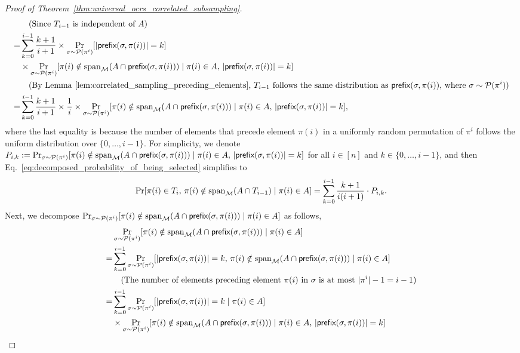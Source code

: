 \documentclass[11pt]{article}
\newcommand{\M}{{\mathcal M}}
\newcommand{\cP}{\mathcal P}
\newcommand{\pref}{\textnormal{\sffamily prefix}}
\newcommand{\spa}{\textnormal{span}}
\begin{document}
\begin{proof}[Proof of Theorem~\ref{thm:universal_ocrs_correlated_subsampling}]
\begin{align}
    &\quad\text{(Since $T_{i-1}$ is independent of $A$)}\nonumber\\
    =&\sum_{k=0}^{i-1} \frac{k+1}{i+1}\times\Pr_{\sigma\sim\cP(\pi^i)}[|\pref(\sigma,\pi(i))|=k]\nonumber\\
    &\times\Pr_{\sigma\sim\cP(\pi^i)}[\pi(i)\notin\spa_{\M}(A\cap \pref(\sigma,\pi(i)))\mid \pi(i)\in A,\,|\pref(\sigma,\pi(i))|=k]\nonumber\\
    &\quad\text{(By Lemma~\ref{lem:correlated_sampling_preceding_elements}, $T_{i-1}$ follows the same distribution as $\pref(\sigma,\pi(i))$, where $\sigma\sim\cP(\pi^i)$)}\nonumber\\
    =&\sum_{k=0}^{i-1} \frac{k+1}{i+1}\times\frac{1}{i}\times\Pr_{\sigma\sim\cP(\pi^i)}[\pi(i)\notin\spa_{\M}(A\cap \pref(\sigma,\pi(i)))\mid \pi(i)\in A,\,|\pref(\sigma,\pi(i))|=k],
\end{align}
where the last equality is because the number of elements that precede element $\pi(i)$ in a uniformly random permutation of $\pi^i$ follows the uniform distribution over $\{0,\dots,i-1\}$. For simplicity, we denote $P_{i,k}:=\Pr_{\sigma\sim\cP(\pi^i)}[\pi(i)\notin\spa_{\M}(A\cap \pref(\sigma,\pi(i)))\mid \pi(i)\in A,\,|\pref(\sigma,\pi(i))|=k]$ for all $i\in[n]$ and $k\in\{0,\dots,i-1\}$, and then Eq.~\eqref{eq:decomposed_probability_of_being_selected} simplifies to
\begin{equation}\label{eq:decomposed_probability_of_being_selected_simplified}
    \Pr[\pi(i)\in T_i,\,\pi(i)\notin\spa_{\M}(A\cap T_{i-1})\mid \pi(i)\in A]=\sum_{k=0}^{i-1} \frac{k+1}{i(i+1)}\cdot P_{i,k}.
\end{equation}
Next, we decompose $\Pr_{\sigma\sim\cP(\pi^i)}[\pi(i)\notin\spa_{\M}(A\cap \pref(\sigma,\pi(i)))\mid \pi(i)\in A]$ as follows,
\begin{align}\label{eq:decomposed_probabilty_of_not_being_spanned}
&\Pr_{\sigma\sim\cP(\pi^i)}[\pi(i)\notin\spa_{\M}(A\cap \pref(\sigma,\pi(i)))\mid \pi(i)\in A]\nonumber\\
=&\sum_{k=0}^{i-1}\Pr_{\sigma\sim\cP(\pi^i)}[|\pref(\sigma,\pi(i))|=k,\,\pi(i)\notin\spa_{\M}(A\cap \pref(\sigma,\pi(i)))\mid \pi(i)\in A]\nonumber\\
&\quad\text{(The number of elements preceding element $\pi(i)$ in $\sigma$ is at most $|\pi^i|-1=i-1$)}\nonumber\\
=&\sum_{k=0}^{i-1}\Pr_{\sigma\sim\cP(\pi^i)}[|\pref(\sigma,\pi(i))|=k\mid \pi(i)\in A]\nonumber\\
&\times\Pr_{\sigma\sim\cP(\pi^i)}[\pi(i)\notin\spa_{\M}(A\cap \pref(\sigma,\pi(i)))\mid \pi(i)\in A,\,|\pref(\sigma,\pi(i))|=k]\nonumber\\

\end{align}
\end{proof}
\end{document}
